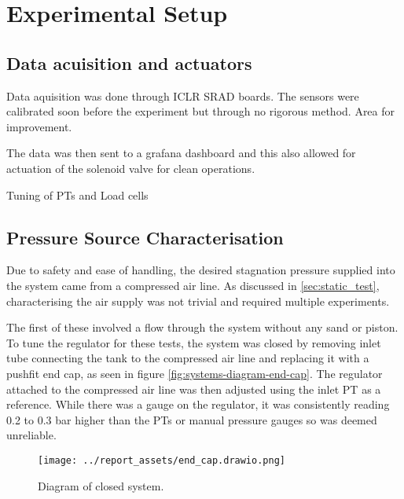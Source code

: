 \section{Experimental Setup}
\subsection{Data acuisition and actuators}
Data aquisition was done through ICLR SRAD boards. The sensors were calibrated soon before the experiment but through no rigorous method. Area for improvement.

The data was then sent to a grafana dashboard and this also allowed for actuation of the solenoid valve for clean operations.

Tuning of PTs and Load cells
\subsection{Pressure Source Characterisation}
Due to safety and ease of handling, the desired stagnation pressure supplied into the system came from a compressed air line. As discussed in \autoref{sec:static_test}, characterising the air supply was not trivial and required multiple experiments. 

The first of these involved a flow through the system without any sand or piston. To tune the regulator for these tests, the system was closed by removing inlet tube connecting the tank to the compressed air line and replacing it with a pushfit end cap, as seen in figure \autoref{fig:systems-diagram-end-cap}. The regulator attached to the compressed air line was then adjusted using the inlet PT as a reference. While there was a gauge on the regulator, it was consistently reading 0.2 to 0.3 bar higher than the PTs or manual pressure gauges so was deemed unreliable. 
\begin{figure}[htbp]
    \centering
    \begin{minipage}{0.45\textwidth}
        \centering
        \texttt{[image: ../report\_assets/end\_cap.drawio.png]}
        \caption{Diagram of closed system.}\label{fig:systems-diagram-end-cap}
    \end{minipage}
\end{figure}

